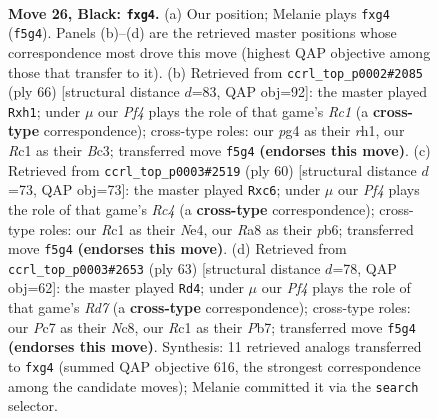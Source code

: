 \documentclass[11pt]{article}
\begin{document}
\clearpage

\begin{figure}[p]\centering
\begin{subfigure}{0.46\textwidth}\centering
\resizebox{\linewidth}{!}{%
\newchessgame
\chessboard[
  setfen={r3n1k1/P1p3bp/1p4p1/5p2/4pPPP/R7/3NR1BK/2r5 b - - 0 26},
  showmover=false,
  pgfstyle=straightmove, color=movearrow, markmove={f5-g4}
]}
\caption{}
\end{subfigure}\hfill
\begin{subfigure}{0.46\textwidth}\centering
\resizebox{\linewidth}{!}{%
\newchessgame
\chessboard[
  setfen={3r4/pp1n1k2/2p1pb2/5p2/3PP3/P1BN1KP1/1P6/2R4r w - - 0 34},
  showmover=false,
  pgfstyle=straightmove, color=movearrow, markmove={c1-h1}
]}
\caption{}
\end{subfigure}
\\[4pt]
\begin{subfigure}{0.46\textwidth}\centering
\resizebox{\linewidth}{!}{%
\newchessgame
\chessboard[
  setfen={r4k2/4b1p1/rpp5/P6p/1PR1NP2/4K1P1/7P/R7 w - - 0 31},
  showmover=false,
  pgfstyle=straightmove, color=movearrow, markmove={c4-c6}
]}
\caption{}
\end{subfigure}\hfill
\begin{subfigure}{0.46\textwidth}\centering
\resizebox{\linewidth}{!}{%
\newchessgame
\chessboard[
  setfen={2n1r1k1/1p3pp1/2p4p/2P1pP2/Pp2R3/1B6/3r1PPP/1R3K2 b - - 5 32},
  showmover=false,
  pgfstyle=straightmove, color=movearrow, markmove={d2-d4}
]}
\caption{}
\end{subfigure}
\caption{\textbf{Move 26, Black: \texttt{fxg4}.} (a) Our position; Melanie plays \texttt{fxg4} (\texttt{f5g4}). Panels (b)--(d) are the retrieved master positions whose correspondence most drove this move (highest QAP objective among those that transfer to it). (b) Retrieved from \texttt{ccrl\_top\_p0002\#2085} (ply 66) [structural distance $d$=83, QAP obj=92]: the master played \texttt{Rxh1}; under $\mu$ our \emph{Pf4} plays the role of that game's \emph{Rc1} (a \textbf{cross-type} correspondence); cross-type roles: our \emph{p}g4 as their \emph{r}h1, our \emph{R}c1 as their \emph{B}c3; transferred move \texttt{f5g4} \textbf{(endorses this move)}. (c) Retrieved from \texttt{ccrl\_top\_p0003\#2519} (ply 60) [structural distance $d$=73, QAP obj=73]: the master played \texttt{Rxc6}; under $\mu$ our \emph{Pf4} plays the role of that game's \emph{Rc4} (a \textbf{cross-type} correspondence); cross-type roles: our \emph{R}c1 as their \emph{N}e4, our \emph{R}a8 as their \emph{p}b6; transferred move \texttt{f5g4} \textbf{(endorses this move)}. (d) Retrieved from \texttt{ccrl\_top\_p0003\#2653} (ply 63) [structural distance $d$=78, QAP obj=62]: the master played \texttt{Rd4}; under $\mu$ our \emph{Pf4} plays the role of that game's \emph{Rd7} (a \textbf{cross-type} correspondence); cross-type roles: our \emph{P}c7 as their \emph{N}c8, our \emph{R}c1 as their \emph{P}b7; transferred move \texttt{f5g4} \textbf{(endorses this move)}. Synthesis: 11 retrieved analogs transferred to \texttt{fxg4} (summed QAP objective 616, the strongest correspondence among the candidate moves); Melanie committed it via the \texttt{search} selector.}
\label{fig:thought-m51}
\end{figure}
\end{document}
